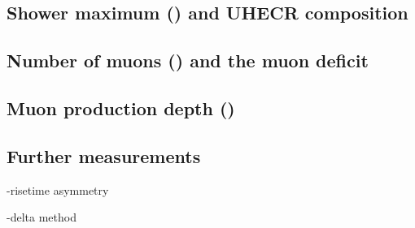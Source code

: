 \subsection{Shower maximum (\xmax) and UHECR composition}

\subsection{Number of muons (\nmu) and the muon deficit}

\subsection{Muon production depth (\xmumax)}

\subsection{Further measurements}

-risetime asymmetry

-delta method





